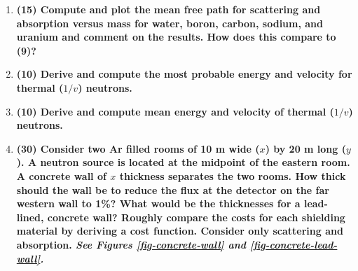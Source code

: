 \documentclass[11pt,a4paper]{article}
\begin{document}
\begin{enumerate}[leftmargin=*,topsep=0pt,font=\bfseries]
        
        
        
        
        
        
        
        
        
        
        
        
        \newpage
    \item\textbf{(15) Compute and plot the mean free path for scattering and absorption versus mass for water, boron, carbon, sodium, and uranium and comment on the results. How does this compare to (9)?}
        \vspace{0.25in}\\
        
        
        
        
        
        
        
        
        
        
        
        
        
        
        \newpage
    \item\textbf{(10) Derive and compute the most probable energy and velocity for thermal ($1/v$) neutrons.}
        \vspace{0.25in}\\
        
        
        
        
        
        
        
        
        
        
        
        
        
        
        \newpage
    \item\textbf{(10) Derive and compute mean energy and velocity of thermal ($1/v$) neutrons.}
        \vspace{0.25in}\\
        
        
        
        
        
        
        
        
        
        
        
        
        \newpage
    \item\textbf{(30) Consider two Ar filled rooms of 10 m wide ($x$) by 20 m long ($y$). A neutron source is located at the midpoint of the eastern room. A concrete wall of $x$ thickness separates the two rooms. How thick should the wall be to reduce the flux at the detector on the far western wall to 1\%? What would be the thicknesses for a lead-lined, concrete wall? Roughly compare the costs for each shielding material by deriving a cost function. Consider only scattering and absorption. \textit{See Figures \ref{fig-concrete-wall} and \ref{fig-concrete-lead-wall}.}}
        \vspace{0.25in}\\
\end{enumerate}
\end{document}
